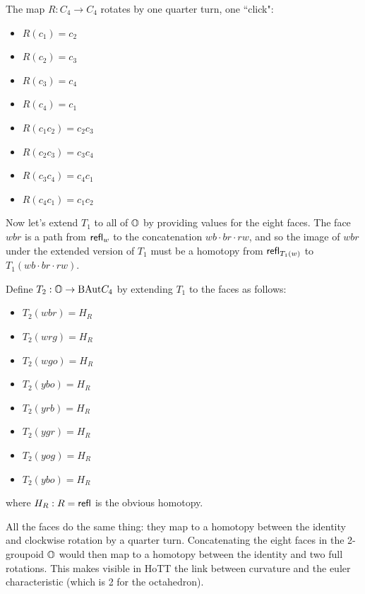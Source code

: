 \begin{mydef}
The map \( R:C_4\to C_4 \) rotates by one quarter turn, one ``click":
\begin{multicols}{2}
\begin{itemize}
\item \( R(c_1) = c_2 \)
\item \( R(c_2) = c_3 \)
\item \( R(c_3) = c_4 \)
\item \( R(c_4) = c_1 \)
\item \( R(c_1c_2) = c_2c_3 \)
\item \( R(c_2c_3) = c_3c_4 \)
\item \( R(c_3c_4) = c_4c_1 \)
\item \( R(c_4c_1) = c_1c_2 \)
\end{itemize}
\end{multicols}
\end{mydef}

Now let's extend \( T_1 \) to all of \( \mathbb{O} \) by providing values for the eight faces. The face \( wbr \) is a path from \( \mathsf{refl}_w \) to the concatenation \( wb\cdot br\cdot rw \), and so the image of \( wbr \) under the extended version of \( T_1 \) must be a homotopy from \( \mathsf{refl}_{T_1(w)} \) to \( T_1(wb\cdot br\cdot rw) \).

\begin{mydef}
Define \( T_2:\mathbb{O}\to\mathrm{BAut} C_4 \) by extending \( T_1 \) to the faces as follows:
\begin{multicols}{2}
\begin{itemize}
\item \( T_2(wbr)=H_R \) 
\item \( T_2(wrg)=H_R \)
\item \( T_2(wgo)=H_R \)
\item \( T_2(ybo)=H_R \)
\item \( T_2(yrb)=H_R \) 
\item \( T_2(ygr)=H_R \)
\item \( T_2(yog)=H_R \)
\item \( T_2(ybo)=H_R \)
\end{itemize}
\end{multicols}
where \( H_R:R=\mathsf{refl} \) is the obvious homotopy.
\end{mydef}

All the faces do the same thing: they map to a homotopy between the identity and clockwise rotation by a quarter turn. Concatenating the eight faces in the 2-groupoid \( \mathbb{O} \) would then map to a homotopy between the identity and two full rotations. This makes visible in HoTT the link between curvature and the euler characteristic (which is 2 for the octahedron).

